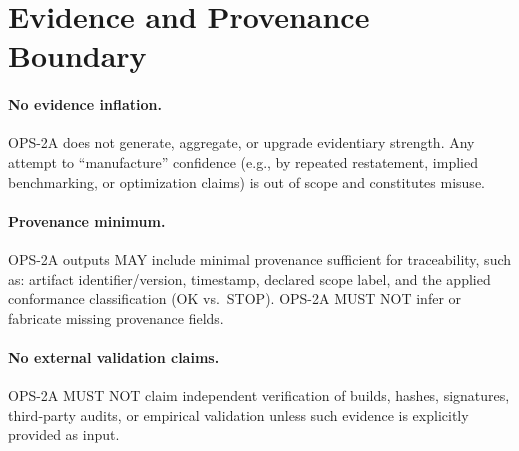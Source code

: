﻿%

\section{Evidence and Provenance Boundary}

\paragraph{No evidence inflation.}
OPS-2A does not generate, aggregate, or upgrade evidentiary strength. Any attempt to
``manufacture'' confidence (e.g., by repeated restatement, implied benchmarking, or
optimization claims) is out of scope and constitutes misuse.

\paragraph{Provenance minimum.}
OPS-2A outputs MAY include minimal provenance sufficient for traceability, such as:
artifact identifier/version, timestamp, declared scope label, and the applied conformance
classification (OK vs.\ STOP). OPS-2A MUST NOT infer or fabricate missing provenance fields.

\paragraph{No external validation claims.}
OPS-2A MUST NOT claim independent verification of builds, hashes, signatures, third-party
audits, or empirical validation unless such evidence is explicitly provided as input.
